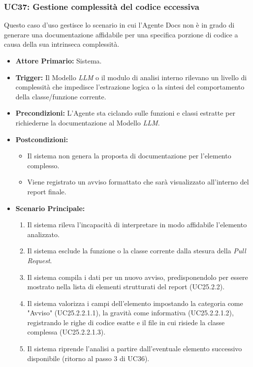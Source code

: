 \documentclass[12pt, a4paper]{article}
\begin{document}
\subsubsection{UC37: Gestione complessità del codice eccessiva}\label{uc:37}
Questo caso d'uso gestisce lo scenario in cui l'Agente Docs non è in grado di generare una documentazione affidabile per una specifica porzione di codice a causa della sua intrinseca complessità.

\begin{itemize}
    \item \textbf{Attore Primario:} Sistema.
    \item \textbf{Trigger:} Il Modello \textit{LLM} o il modulo di analisi interno rilevano un livello di complessità che impedisce l'estrazione logica o la sintesi del comportamento della classe/funzione corrente.
    \item \textbf{Precondizioni:} L'Agente sta ciclando sulle funzioni e classi estratte per richiederne la documentazione al Modello \textit{LLM}.
    \item \textbf{Postcondizioni:} 
    \begin{itemize}
        \item Il sistema non genera la proposta di documentazione per l'elemento complesso.
        \item Viene registrato un avviso formattato che sarà visualizzato all'interno del report finale.
    \end{itemize}
    \item \textbf{Scenario Principale:}
    \begin{enumerate}
        \item Il sistema rileva l'incapacità di interpretare in modo affidabile l'elemento analizzato.
        \item Il sistema esclude la funzione o la classe corrente dalla stesura della \textit{Pull Request}.
        \item Il sistema compila i dati per un nuovo avviso, predisponendolo per essere mostrato nella lista di elementi strutturati del report (UC25.2.2).
        \item Il sistema valorizza i campi dell'elemento impostando la categoria come "Avviso" (UC25.2.2.1.1), la gravità come informativa (UC25.2.2.1.2), registrando le righe di codice esatte e il file in cui risiede la classe complessa (UC25.2.2.1.3).
        \item Il sistema riprende l'analisi a partire dall'eventuale elemento successivo disponibile (ritorno al passo 3 di UC36).
    \end{enumerate}
\end{itemize}
\end{document}
